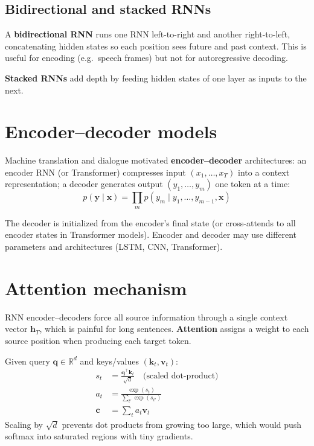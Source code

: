 \subsection{Bidirectional and stacked RNNs}

A \textbf{bidirectional RNN} runs one RNN left-to-right and another right-to-left, concatenating hidden states so each position sees future and past context. This is useful for encoding (e.g.\ speech frames) but not for autoregressive decoding.

\textbf{Stacked RNNs} add depth by feeding hidden states of one layer as inputs to the next.


\section{Encoder--decoder models}

Machine translation and dialogue motivated \textbf{encoder--decoder} architectures: an encoder RNN (or Transformer) compresses input $(x_1,\ldots,x_T)$ into a context representation; a decoder generates output $(y_1,\ldots,y_m)$ one token at a time:
\[
p(\mathbf{y}\mid\mathbf{x}) = \prod_{m} p(y_m \mid y_1,\ldots,y_{m-1}, \mathbf{x})
\]

The decoder is initialized from the encoder's final state (or cross-attends to all encoder states in Transformer models). Encoder and decoder may use different parameters and architectures (LSTM, CNN, Transformer).

\section{Attention mechanism}


RNN encoder--decoders force all source information through a single context vector $\mathbf{h}_T$, which is painful for long sentences. \textbf{Attention} assigns a weight to each source position when producing each target token.

Given query $\mathbf{q} \in \mathbb{R}^d$ and keys/values $(\mathbf{k}_t, \mathbf{v}_t)$:
\begin{align*}
s_t &= \frac{\mathbf{q}^\top \mathbf{k}_t}{\sqrt{d}} \quad \text{(scaled dot-product)} \\
a_t &= \frac{\exp(s_t)}{\sum_{t'} \exp(s_{t'})} \\
\mathbf{c} &= \sum_t a_t \mathbf{v}_t
\end{align*}
Scaling by $\sqrt{d}$ prevents dot products from growing too large, which would push softmax into saturated regions with tiny gradients.

